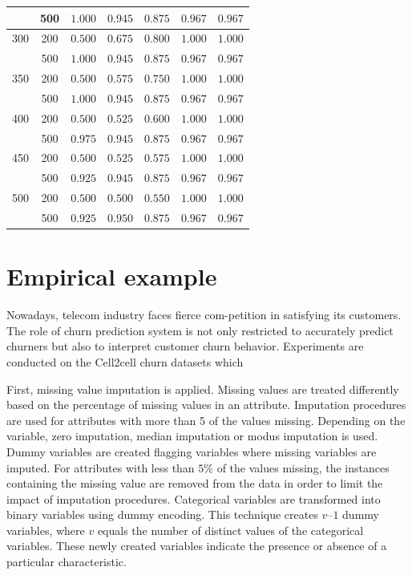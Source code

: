 \documentclass[11pt,onside,a4paper,fleqn]{report}
\begin{document}
\begin{table}[!h]
\begin{center}
\begin{tabular}{|c | c | c | c | c | c | c | }
                & 500      &  $1.000$	&  $0.945$	&  $0.875$	&  $0.967$	&  $0.967$\\ \hline
    300         & 200      &  $0.500$	&  $0.675$	&  $0.800$	&  $1.000$	&  $1.000$\\
                & 500      &  $1.000$	&  $0.945$	&  $0.875$	&  $0.967$	&  $0.967$\\ \hline
    350         & 200      &  $0.500$	&  $0.575$	&  $0.750$	&  $1.000$	&  $1.000$\\
                & 500      &  $1.000$	&  $0.945$	&  $0.875$	&  $0.967$	&  $0.967$\\ \hline
    400         & 200      &  $0.500$	&  $0.525$	&  $0.600$	&  $1.000$	&  $1.000$\\
                & 500      &  $0.975$	&  $0.945$	&  $0.875$	&  $0.967$	&  $0.967$\\ \hline
    450         & 200      &  $0.500$	&  $0.525$	&  $0.575$	&  $1.000$	&  $1.000$\\
                & 500      &  $0.925$	&  $0.945$	&  $0.875$	&  $0.967$	&  $0.967$\\ \hline
    500         & 200      &  $0.500$	&  $0.500$	&  $0.550$	&  $1.000$	&  $1.000$\\
                & 500      &  $0.925$	&  $0.950$	&  $0.875$	&  $0.967$	&  $0.967$\\ \hline
    \end{tabular}
    \end{center}
\end{table}
 
\chapter{Empirical example}

\hspace{0.8cm}Nowadays, telecom industry faces fierce com-petition in satisfying its customers. The role of churn prediction system is not only restricted to accurately predict churners but also to interpret customer churn behavior. 
Experiments are conducted on the Cell2cell churn datasets which 

\hspace{0.8cm}First, missing value imputation is applied. Missing values are treated differently based on the percentage of missing values in
an attribute. 
Imputation procedures are used for attributes with more than 5 of the values missing. 
Depending on the variable, zero imputation, median imputation or modus imputation is used.
Dummy variables are created flagging variables where missing variables are imputed. 
For attributes with less than $5\%$ of the values missing, the instances containing the missing value are removed from the data in order to limit the impact of imputation
procedures. 
Categorical variables are transformed into binary variables using dummy encoding. 
This technique creates $v–1$ dummy variables, where $v$ equals the number of distinct values of the categorical variables. 
These newly created variables indicate the presence or absence of a particular characteristic.
\end{document}

